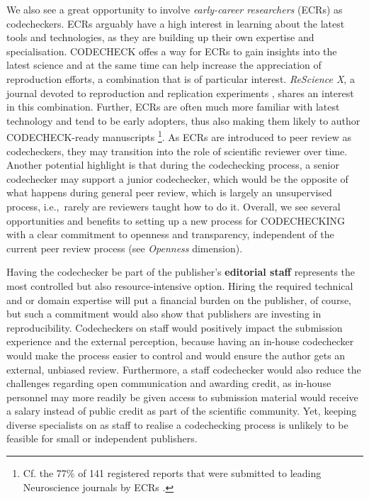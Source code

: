 \documentclass[12pt]{article}
\begin{document}
We also see a great opportunity to involve \emph{early-career researchers} (ECRs) as codecheckers.
ECRs arguably have a high interest in learning
about the latest tools and technologies, as they are building up their own
expertise and specialisation.
CODECHECK offes a way for ECRs to gain insights into the latest science and at the same time can help increase the appreciation of reproduction efforts, a combination that is of particular interest.
\emph{ReScience X}, a journal devoted to reproduction and replication experiments \cite{roesch_new_2020}, shares an interest in this combination.
Further, ECRs are often much more familiar with latest technology and tend to be early adopters, thus also making them likely to author CODECHECK-ready manuscripts
\footnote{Cf. the 77\% of 141 registered reports that were submitted to leading Neuroscience journals by ECRs \cite{chambers_registered_2019}.}.
As ECRs are introduced to peer review as codecheckers, they may transition into the role of scientific reviewer over time.
Another potential highlight is that during the codechecking process, a senior codechecker may support a junior codechecker, which would be the opposite of what happens during general peer review, which is largely an unsupervised process, i.e.,~rarely are reviewers taught how to do it.
Overall, we see several opportunities and benefits to setting up a new process for CODECHECKING with a clear commitment to openness and transparency, independent of the current peer review process (see \emph{Openness} dimension).

Having the codechecker be part of the publisher's \textbf{editorial staff} represents the most controlled but also
resource-intensive option.
Hiring the required technical and or domain expertise will put a financial burden on the publisher, of course, but such a commitment would also show that publishers are investing in reproducibility.
Codecheckers on staff would positively impact the submission experience and the external perception, because having an in-house codechecker would make the process easier to control and would ensure the author gets an external, unbiased review.
Furthermore, a staff codechecker would also reduce the challenges regarding open communication and awarding credit, as in-house personnel may more readily be given access to submission material would receive a salary instead of public credit as part of the scientific community.
Yet, keeping diverse specialists on as staff to realise a codechecking process is 
unlikely to be feasible for small or independent publishers.
\end{document}

